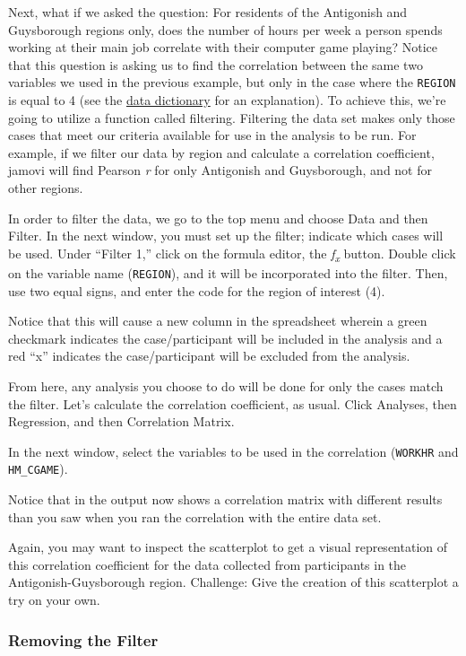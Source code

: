 \documentclass[
]{book}
\begin{document}
Next, what if we asked the question: For residents of the Antigonish and Guysborough regions only, does the number of hours per week a person spends working at their main job correlate with their computer game playing? Notice that this question is asking us to find the correlation between the same two variables we used in the previous example, but only in the case where the \texttt{REGION} is equal to 4 (see the \href{https://moodle.stfx.ca/mod/url/view.php?id=830017}{data dictionary} for an explanation). To achieve this, we're going to utilize a function called filtering. Filtering the data set makes only those cases that meet our criteria available for use in the analysis to be run. For example, if we filter our data by region and calculate a correlation coefficient, jamovi will find Pearson \emph{r} for only Antigonish and Guysborough, and not for other regions.

In order to filter the data, we go to the top menu and choose {Data} and then {Filter}. In the next window, you must set up the filter; indicate which cases will be used. Under ``Filter 1,'' click on the formula editor, the {\emph{f\textsubscript{x}}} button. Double click on the variable name (\texttt{REGION}), and it will be incorporated into the filter. Then, use two equal signs, and enter the code for the region of interest (4).

Notice that this will cause a new column in the spreadsheet wherein a green checkmark indicates the case/participant will be included in the analysis and a red ``x'' indicates the case/participant will be excluded from the analysis.

From here, any analysis you choose to do will be done for only the cases match the filter. Let's calculate the correlation coefficient, as usual. Click {Analyses}, then {Regression}, and then {Correlation Matrix}.

In the next window, select the variables to be used in the correlation (\texttt{WORKHR} and \texttt{HM\_CGAME}).

Notice that in the output now shows a correlation matrix with different results than you saw when you ran the correlation with the entire data set.

Again, you may want to inspect the scatterplot to get a visual representation of this correlation coefficient for the data collected from participants in the Antigonish-Guysborough region. Challenge: Give the creation of this scatterplot a try on your own.

\hypertarget{removing-the-filter}{%
\subsubsection{Removing the Filter}\label{removing-the-filter}}
\end{document}
